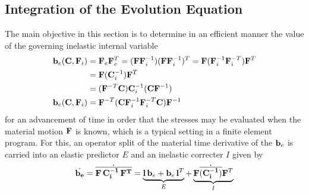 \subsection{Integration of the Evolution Equation}
The main objective in this section is to determine in an efficient manner the value of the governing inelastic internal variable 
\begin{align}
    \nonumber \mathbf{b}_{e}(\mathbf{C}, \mathbf{F}_{i}) 
    &= \mathbf{F}_{e} \mathbf{F}_{e}^{T} = (\mathbf{F} \mathbf{F}_{i}^{-1}) (\mathbf{F} \mathbf{F}_{i}^{-1})^{T}  = \mathbf{F} (\mathbf{F}_{i}^{-1} \mathbf{F}_{i}^{-T})  \mathbf{F}^{T} \\
    \nonumber
    &= \mathbf{F} (\mathbf{C}_{i}^{-1})  \mathbf{F}^{T} \\
    \nonumber
    &= (\mathbf{F}^{-T} \mathbf{C}) \mathbf{C}_{i}^{-1} (\mathbf{C} \mathbf{F}^{-1})  \\
    \mathbf{b}_{e}(\mathbf{C}, \mathbf{F}_{i}) 
    &= \mathbf{F}^{-T} (\mathbf{C} \mathbf{F}_{i}^{-1} \mathbf{F}_{i}^{-T} \mathbf{C}) \mathbf{F}^{-1} 
\end{align} for an advancement of time in order that the stresses may be evaluated when the material motion \(\mathbf{F}\) is known, which is a typical setting in a finite element program.
For this, an operator split of the material time derivative of the \(\mathbf{b}_{e}\) is carried into an elastic predictor \(E\) and an inelastic correcter \(I\) given by
\begin{equation}
    \dot{\mathbf{b}_{e}} = \dot{\overline{\mathbf{F} \, \mathbf{C}_{i}^{-1} \, \mathbf{F}^{T}}} 
    = \underbrace{\mathbf{l}\, \mathbf{b}_{e} + \mathbf{b}_{e}\, \mathbf{l}^{T}}_{E}
    + \underbrace{\mathbf{F} \dot{\overline{(\mathbf{C}_{i}^{-1})}} \mathbf{F}^{T}}_{I}
\end{equation}

